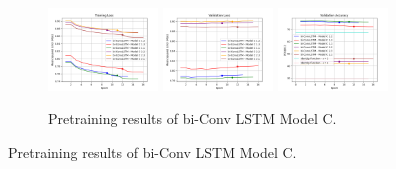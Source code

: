 \documentclass{beamer}
\begin{document}
\begin{frame}
\begin{figure}[htbp]
        \begin{subfigure}[b]{\textwidth}
            \centering
            \includegraphics[width=0.32\textwidth]{./entities/pretrained_new/unipose2/train_losses.png}
            \includegraphics[width=0.32\textwidth]{./entities/pretrained_new/unipose2/val_losses.png}
            \includegraphics[width=0.32\textwidth]{./entities/pretrained_new/unipose2/val_accs.png}
            \caption{Pretraining results of bi-Conv LSTM Model C.}
        \end{subfigure}
        \hfill
    \end{figure}
\end{frame}
\end{document}
